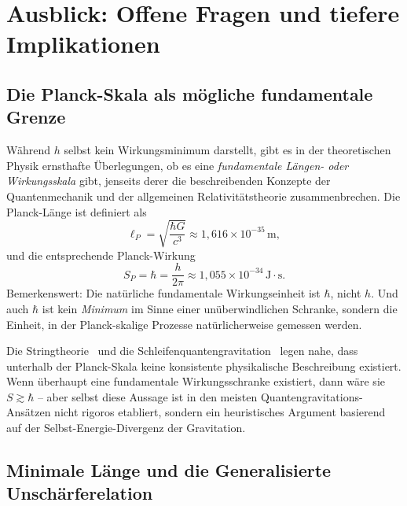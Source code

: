 ﻿\documentclass[12pt,a4paper]{article}
\theoremstyle{plain}
\theoremstyle{definition}
\theoremstyle{remark}
\begin{document}
\section{Ausblick: Offene Fragen und tiefere Implikationen}

\subsection{Die Planck-Skala als mögliche fundamentale Grenze}

Während $h$ selbst kein Wirkungsminimum darstellt, gibt es in der theoretischen Physik
ernsthafte Überlegungen, ob es eine \emph{fundamentale Längen- oder Wirkungsskala} gibt,
jenseits derer die beschreibenden Konzepte der Quantenmechanik und der allgemeinen
Relativitätstheorie zusammenbrechen. Die Planck-Länge ist definiert als
\begin{equation}
  \ell_P = \sqrt{\frac{\hbar G}{c^3}} \approx 1{,}616\times 10^{-35}\,\text{m},
\end{equation}
und die entsprechende Planck-Wirkung
\begin{equation}
  S_P = \hbar = \frac{h}{2\pi} \approx 1{,}055\times 10^{-34}\,\mathrm{J{\cdot}s}.
\end{equation}
Bemerkenswert: Die natürliche fundamentale Wirkungseinheit ist $\hbar$, nicht $h$. Und
auch $\hbar$ ist kein \emph{Minimum} im Sinne einer unüberwindlichen Schranke, sondern die
Einheit, in der Planck-skalige Prozesse natürlicherweise gemessen werden.

Die Stringtheorie~\cite{polchinski1998} und die Schleifenquantengravitation~\cite{rovelli2004}
legen nahe, dass unterhalb der Planck-Skala keine konsistente physikalische Beschreibung
existiert. Wenn überhaupt eine fundamentale Wirkungsschranke existiert, dann wäre sie
$S \gtrsim \hbar$ -- aber selbst diese Aussage ist in den meisten Quantengravitations-Ansätzen
nicht rigoros etabliert, sondern ein heuristisches Argument basierend auf der
Selbst-Energie-Divergenz der Gravitation.

\subsection{Minimale Länge und die Generalisierte Unschärferelation}
\end{document}
